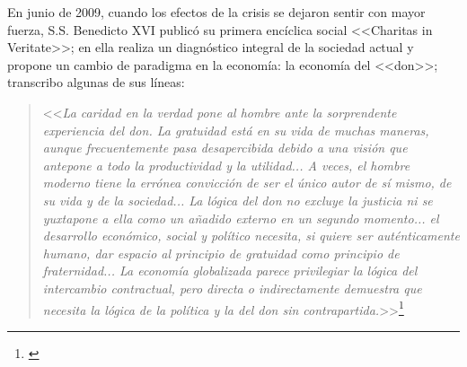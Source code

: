 En junio de 2009, cuando los efectos de la crisis se dejaron sentir con mayor fuerza, S.S. Benedicto XVI publicó su primera encíclica social <<Charitas in Veritate>>; en ella realiza un diagnóstico integral de la sociedad actual y propone un cambio de paradigma en la economía: la economía del <<don>>; transcribo algunas de sus líneas:

\begin{quote}
<<\textit{La caridad en la verdad pone al hombre ante la sorprendente experiencia del don. La gratuidad está en su vida de muchas maneras, aunque frecuentemente pasa desapercibida debido a una visión que antepone a todo la productividad y la utilidad... A veces, el hombre moderno tiene la errónea convicción de ser el único autor de sí mismo, de su vida y de la sociedad... La lógica del don no excluye la justicia ni se yuxtapone a ella como un añadido externo en un segundo momento... el desarrollo económico, social y político necesita, si quiere ser auténticamente humano, dar espacio al principio de gratuidad como principio de fraternidad... La economía globalizada parece privilegiar la lógica del intercambio contractual, pero directa o indirectamente demuestra que necesita la lógica de la política y la del don sin contrapartida.}>>\footnote{\citep{BenedictoXVI2009}}
\end{quote}
